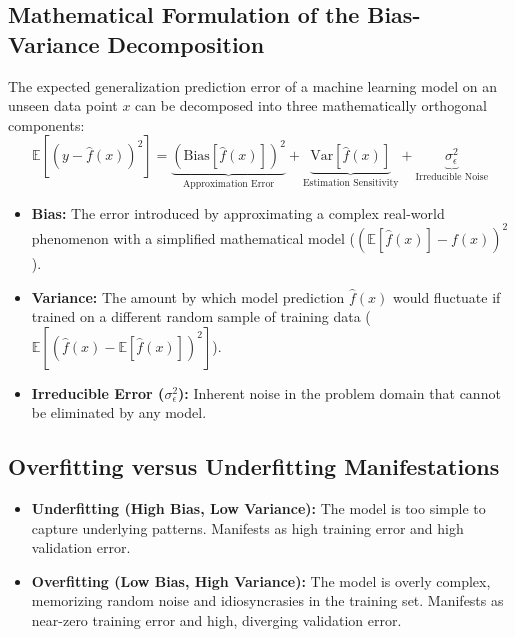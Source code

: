 \subsection{Mathematical Formulation of the Bias-Variance Decomposition}
The expected generalization prediction error of a machine learning model on an unseen data point $x$ can be decomposed into three mathematically orthogonal components:
\begin{equation}
\label{eq:bias_variance_decomp}
\mathbb{E}\left[(y - \hat{f}(x))^2\right] = \underbrace{\left(\text{Bias}\left[\hat{f}(x)\right]\right)^2}_{\text{Approximation Error}} + \underbrace{\text{Var}\left[\hat{f}(x)\right]}_{\text{Estimation Sensitivity}} + \underbrace{\sigma_{\epsilon}^2}_{\text{Irreducible Noise}}
\end{equation}
\begin{itemize}
    \item \textbf{Bias:} The error introduced by approximating a complex real-world phenomenon with a simplified mathematical model ($(\mathbb{E}[\hat{f}(x)] - f(x))^2$).
    \item \textbf{Variance:} The amount by which model prediction $\hat{f}(x)$ would fluctuate if trained on a different random sample of training data ($\mathbb{E}[(\hat{f}(x) - \mathbb{E}[\hat{f}(x)])^2]$).
    \item \textbf{Irreducible Error ($\sigma_\epsilon^2$):} Inherent noise in the problem domain that cannot be eliminated by any model.
\end{itemize}

\subsection{Overfitting versus Underfitting Manifestations}
\begin{itemize}
    \item \textbf{Underfitting (High Bias, Low Variance):} The model is too simple to capture underlying patterns. Manifests as high training error and high validation error.
    \item \textbf{Overfitting (Low Bias, High Variance):} The model is overly complex, memorizing random noise and idiosyncrasies in the training set. Manifests as near-zero training error and high, diverging validation error.
\end{itemize}

